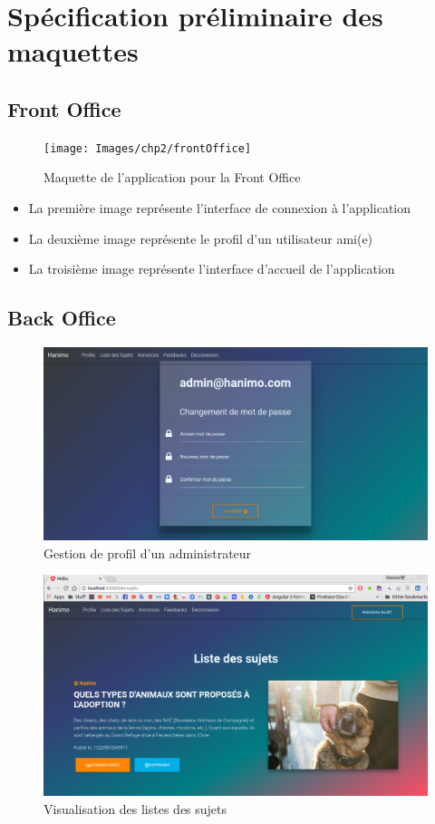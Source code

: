 \documentclass[11pt,a4paper,oneside]{book}
\begin{document}
			\section{Spécification préliminaire des maquettes}	
			\subsection{Front Office}
			\begin{figure}[H]
				\centering
				\texttt{[image: Images/chp2/frontOffice]}
				\caption{Maquette de l'application pour la Front Office}
				\label{fig:frontoffice}
			\end{figure}
			\begin{itemize}
				\item La première image représente  l'interface de connexion à l'application
				\item  La deuxième image représente le profil d'un utilisateur ami(e)
				\item La troisième image représente l'interface d'accueil de l'application
			\end{itemize}
			\subsection{Back Office}
			\begin{figure}[H]
				\centering
				\includegraphics[width=1\textwidth]{"newest maquettes/changement de mot de passe"}
				\caption{Gestion de profil d'un administrateur}
				\label{fig:changement-de-mot-de-passe}
			\end{figure}
			\begin{figure}[H]
				\centering
				\includegraphics[width=1\textwidth]{"newest maquettes/Screenshot from 2018-05-24 02-00-17"}
				\caption{Visualisation des listes des sujets}
				\label{fig:screenshot-from-2018-05-24-02-00-17}
			\end{figure}
\end{document}
